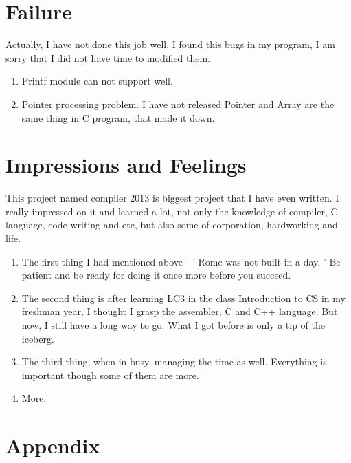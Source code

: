 \documentclass[preprint, 9pt]{sigplanconf}
\begin{document}
\section{Failure}
    Actually, I have not done this job well.
    I found this bugs in my program, I am sorry that I did not have time to modified them.
    \begin{enumerate}
        \item Printf module can not support well.
        \item Pointer processing problem.
            I have not released Pointer and Array are the same thing in C program, that made it down.
    \end{enumerate}

\section{Impressions and Feelings}

    This project named compiler 2013 is biggest project that I have even written.
    I really impressed on it and learned a lot, not only the knowledge of compiler, C-language, code writing and etc, but also some of corporation, hardworking and life.

    \begin{enumerate}
    \item The first thing I had mentioned above - ' Rome was not built in a day. '
    Be patient and be ready for doing it once more before you succeed.

    \item The second thing is after learning LC3 in the class Introduction to CS in my freshman year, I thought I grasp the assembler, C and C++ language.
    But now, I still have a long way to go.
    What I got before is only a tip of the iceberg.

    \item The third thing, when in busy, managing the time as well.
    Everything is important though some of them are more.

    \item More.
    \end{enumerate}

\appendix
\section{Appendix}
\end{document}
